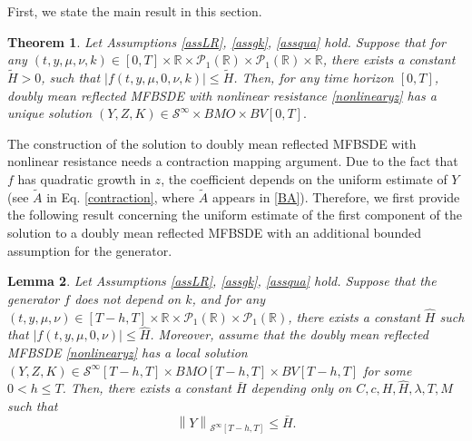 \documentclass[10pt]{article}%
\numberwithin{equation}{section}
\newtheorem{theorem}{Theorem}[section]
\newtheorem{lemma}[theorem]{Lemma}
\begin{document}
First, we state the main result in this section.
\begin{theorem}\label{globalMFBSDE}
Let Assumptions \ref{assLR}, \ref{assgk}, \ref{assqua} hold. Suppose that for any $(t,y,\mu,\nu,k)\in [0,T]\times\mathbb{R}\times\mathcal{P}_1(\mathbb{R})\times\mathcal{P}_1(\mathbb{R})\times\mathbb{R}$, there exists a constant $\tilde{H}>0$, such that $\left|f(t,y,\mu,0,\nu,k)\right|\leq \tilde{H}$. Then, for any time horizon $[0,T]$, doubly mean reflected MFBSDE  with nonlinear resistance \eqref{nonlinearyz} has a unique solution $ (Y,Z,K)\in\mathcal{S}^{\infty}\times BMO \times BV[0,T].$     
\end{theorem}

The construction of the solution to doubly mean reflected MFBSDE with nonlinear resistance needs a contraction mapping argument. Due to the fact that $f$ has quadratic growth in $z$, the coefficient depends on the uniform estimate of $Y$ (see $\tilde{A}$ in Eq. \eqref{contraction}, where $\tilde{A}$ appears in \eqref{BA}). Therefore, we first provide the following result concerning the uniform estimate of the first component of the solution to a doubly mean reflected MFBSDE with an additional bounded assumption for the generator.
\begin{lemma}\label{lem4.6}
Let Assumptions \ref{assLR}, \ref{assgk}, \ref{assqua} hold. Suppose that the generator $f$ does not depend on $k$, and for any $(t,y,\mu,\nu)\in [T-h,T]\times\mathbb{R}\times\mathcal{P}_1(\mathbb{R})\times\mathcal{P}_1(\mathbb{R})$, there exists a constant $\hat{H}$ such that $\left|f(t,y,\mu,0,\nu)\right|\leq \hat{H}$. Moreover, assume that the doubly mean reflected MFBSDE \eqref{nonlinearyz} has a local solution $(Y,Z,K)\in \mathcal{S}^{\infty}[T-h,T]\times BMO[T-h,T]\times BV[T-h,T]$ for some $0<h\leq T$. Then, there exists a constant $\bar{H}$ depending only on $C,c,H,\hat{H},\lambda, T,M$ such that 
$$\left\|Y\right\|_{\mathcal{S}^{\infty}[T-h,T]}\leq \bar{H}.$$
\end{lemma}
\end{document}
